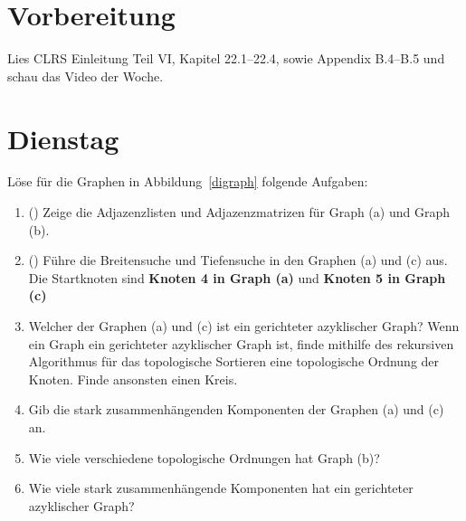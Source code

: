 \documentclass{uebung_cs}
\begin{document}
\section*{Vorbereitung}
Lies CLRS Einleitung Teil VI, Kapitel 22.1--22.4, sowie Appendix B.4--B.5 und schau das Video der Woche.

\section*{Dienstag}

\begin{aufgabe}
	Löse für die Graphen in Abbildung~\ref{digraph} folgende Aufgaben:
	\begin{enumerate}
		\item (\warmup) Zeige die Adjazenzlisten und Adjazenzmatrizen für Graph (a) und Graph (b).
		\item (\warmup) Führe die Breitensuche und Tiefensuche in den Graphen (a) und (c) aus.
		Die Startknoten sind \textbf{Knoten 4 in Graph (a)} und \textbf{Knoten 5 in Graph (c)}
		\item Welcher der Graphen (a) und (c) ist ein gerichteter azyklischer Graph?
		Wenn ein Graph ein gerichteter azyklischer Graph ist, finde mithilfe des rekursiven Algorithmus für das topologische Sortieren eine topologische Ordnung der Knoten.
		Finde ansonsten einen Kreis.
		\item Gib die stark zusammenhängenden Komponenten der Graphen (a) und (c) an.
		\item Wie viele verschiedene topologische Ordnungen hat Graph (b)?
		\item Wie viele stark zusammenhängende Komponenten hat ein gerichteter azyklischer Graph?
	\end{enumerate}
\end{aufgabe}
\end{document}
